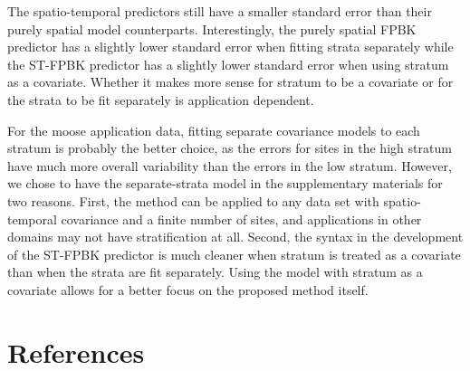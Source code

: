 \documentclass[smallextended]{svjour3}       %
\begin{document}
The spatio-temporal predictors still have a smaller standard error than
their purely spatial model counterparts. Interestingly, the purely
spatial FPBK predictor has a slightly lower standard error when fitting
strata separately while the ST-FPBK predictor has a slightly lower
standard error when using stratum as a covariate. Whether it makes more
sense for stratum to be a covariate or for the strata to be fit
separately is application dependent.

For the moose application data, fitting separate covariance models to
each stratum is probably the better choice, as the errors for sites in
the high stratum have much more overall variability than the errors in
the low stratum. However, we chose to have the separate-strata model in
the supplementary materials for two reasons. First, the method can be
applied to any data set with spatio-temporal covariance and a finite
number of sites, and applications in other domains may not have
stratification at all. Second, the syntax in the development of the
ST-FPBK predictor is much cleaner when stratum is treated as a covariate
than when the strata are fit separately. Using the model with stratum as
a covariate allows for a better focus on the proposed method itself.

\hypertarget{references}{%
\section*{References}\label{references}}
\end{document}
